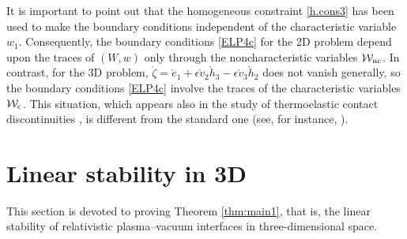 \documentclass[twoside,11pt]{article}
\numberwithin{equation}{section}
\begin{document}
It is important to point out that the homogeneous constraint \eqref{h.cons3} has been used to make the boundary conditions independent of the characteristic variable $w_1$.
Consequently, the boundary conditions \eqref{ELP4c} for the 2D problem depend upon the traces of $(W,w)$ only through the noncharacteristic variables $\mathcal{W}_{\rm nc}$.
In contrast, for the 3D problem, $\mathring{\zeta}=\mathring{e}_1+\epsilon \mathring{v}_2\mathring{h}_3-\epsilon \mathring{v}_3\mathring{h}_2$ does not vanish generally,
so the boundary conditions \eqref{ELP4c} involve the traces of  the characteristic variables $\mathcal{W}_{\rm c}$.
This situation, which appears also in the study of thermoelastic contact discontinuities \cite{CSW20MR4110436}, is different from the standard one (see, for instance, \cite[\S 4.1]{BGS07MR2284507}).
	




\vspace*{2mm}
	\section{Linear stability in 3D} \label{sec:lin3D}
This section is devoted to proving Theorem \ref{thm:main1}, that is, the linear stability of relativistic plasma--vacuum interfaces in three-dimensional space.	
\end{document}
